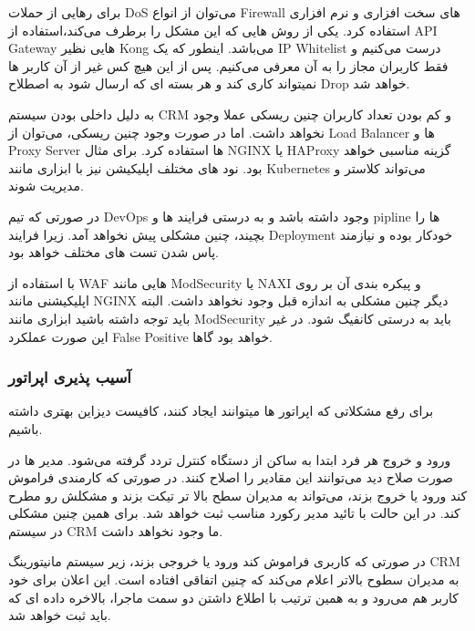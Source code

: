 
برای رهایی از حملات DoS می‌توان از انواع Firewall های سخت افزاری و نرم افزاری استفاده کرد. یکی از روش هایی که این مشکل را برطرف می‌کند،استفاده 
از API Gateway هایی نظیر Kong می‌باشد.
اینطور که یک IP Whitelist درست می‌کنیم و فقط کاربران مجاز را به آن معرفی می‌کنیم.
پس از این هیچ کس غیر از آن کاربر ها نمیتواند کاری کند و هر بسته ای که ارسال شود به اصطلاح Drop خواهد شد.


به دلیل داخلی بودن سیستم CRM و کم بودن تعداد کاربران چنین ریسکی عملا وجود نخواهد داشت.
اما در صورت وجود چنین ریسکی، می‌توان از Load Balancer ها و Proxy Server ها استفاده کرد.
برای مثال NGINX یا HAProxy گزینه مناسبی خواهد بود.
نود های مختلف اپلیکیشن نیز با ابزاری مانند Kubernetes می‌تواند کلاستر و مدیریت شوند.


در صورتی که تیم DevOps وجود داشته باشد و به درستی فرایند ها و pipline ها را بچیند، چنین مشکلی پیش نخواهد آمد.
زیرا فرایند Deployment خودکار بوده و نیازمند پاس شدن تست های مختلف خواهد بود.


با استفاده از WAF هایی مانند ModSecurity یا NAXI و پیکره بندی آن بر روی اپلیکیشنی مانند NGINX دیگر چنین مشکلی به اندازه قبل وجود نخواهد داشت.
البته باید توجه داشته باشید ابزاری مانند ModSecurity باید به درستی کانفیگ شود. در غیر این صورت عملکرد False Positive خواهد بود گاها.

\subsubsection{آسیب پذیری اپراتور}
برای رفع مشکلاتی که اپراتور ها میتوانند ایجاد کنند، کافیست دیزاین بهتری داشته باشیم.


ورود و خروج هر فرد ابتدا به ساکن از دستگاه کنترل تردد گرفته می‌شود. مدیر ها در صورت صلاح دید می‌توانند این مقادیر را اصلاح کنند.
در صورتی که کارمندی فراموش کند ورود یا خروج بزند، می‌تواند به مدیران سطح بالا تر تیکت بزند و مشکلش رو مطرح کند. در این حالت با تائید مدیر رکورد مناسب ثبت خواهد شد.
برای همین چنین مشکلی در سیستم CRM ما وجود نخواهد داشت.


در صورتی که کاربری فراموش کند ورود یا خروجی بزند، زیر سیستم مانیتورینگ CRM به مدیران سطوح بالاتر اعلام می‌کند که چنین اتفاقی افتاده است.
این اعلان برای خود کاربر هم می‌رود و به همین ترتیب با اطلاع داشتن دو سمت ماجرا، بالاخره داده ای که باید ثبت خواهد شد.

